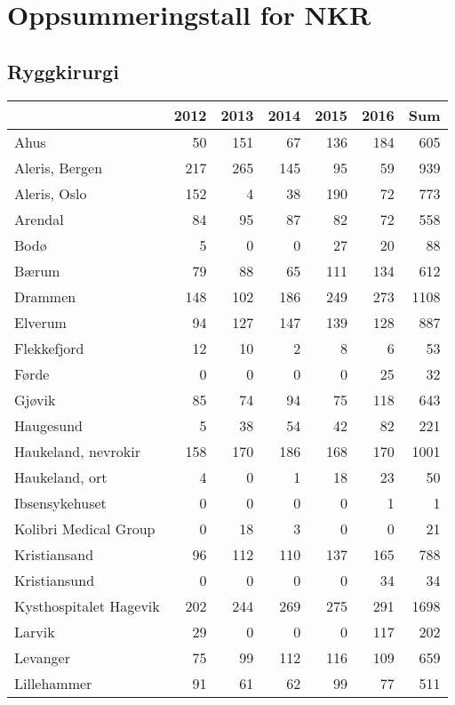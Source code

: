 \clearpage
\section{Oppsummeringstall for NKR}
\subsection*{Ryggkirurgi}
\begin{table}[ht]
\centering
\begin{tabular}{lrrrrrr}
  \hline
 & 2012 & 2013 & 2014 & 2015 & 2016 & Sum \\ 
  \hline
Ahus & 50 & 151 & 67 & 136 & 184 & 605 \\ 
  Aleris, Bergen & 217 & 265 & 145 & 95 & 59 & 939 \\ 
  Aleris, Oslo & 152 & 4 & 38 & 190 & 72 & 773 \\ 
  Arendal & 84 & 95 & 87 & 82 & 72 & 558 \\ 
  Bodø & 5 & 0 & 0 & 27 & 20 & 88 \\ 
  Bærum & 79 & 88 & 65 & 111 & 134 & 612 \\ 
  Drammen & 148 & 102 & 186 & 249 & 273 & 1108 \\ 
  Elverum & 94 & 127 & 147 & 139 & 128 & 887 \\ 
  Flekkefjord & 12 & 10 & 2 & 8 & 6 & 53 \\ 
  Førde & 0 & 0 & 0 & 0 & 25 & 32 \\ 
  Gjøvik & 85 & 74 & 94 & 75 & 118 & 643 \\ 
  Haugesund & 5 & 38 & 54 & 42 & 82 & 221 \\ 
  Haukeland, nevrokir & 158 & 170 & 186 & 168 & 170 & 1001 \\ 
  Haukeland, ort & 4 & 0 & 1 & 18 & 23 & 50 \\ 
  Ibsensykehuset & 0 & 0 & 0 & 0 & 1 & 1 \\ 
  Kolibri Medical Group & 0 & 18 & 3 & 0 & 0 & 21 \\ 
  Kristiansand & 96 & 112 & 110 & 137 & 165 & 788 \\ 
  Kristiansund & 0 & 0 & 0 & 0 & 34 & 34 \\ 
  Kysthospitalet Hagevik & 202 & 244 & 269 & 275 & 291 & 1698 \\ 
  Larvik & 29 & 0 & 0 & 0 & 117 & 202 \\ 
  Levanger & 75 & 99 & 112 & 116 & 109 & 659 \\ 
  Lillehammer & 91 & 61 & 62 & 99 & 77 & 511 \\ 

\end{tabular}
\end{table}

